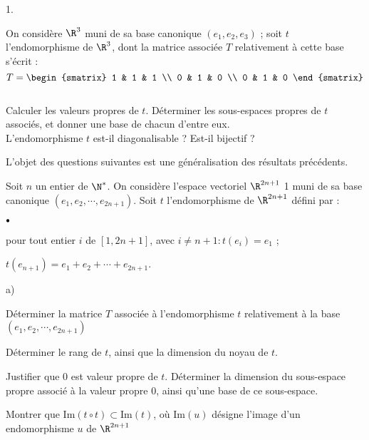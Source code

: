 \documentclass[11pt]{article}%
\begin{document}
\begin{noliste}{1.}
 \setlength{\itemsep}{4mm}
\item On considère $\R^{3}$ muni de sa base canonique $\left(
e_{1},e_{2},e_{3}\right) $ ; soit $t$ l'endomorphisme de $\R^{3}$,
dont la matrice associée $T$ relativement à cette base s'écrit : 
\[
T = 
\begin{smatrix}
1 & 1 & 1 \\
0 & 1 & 0 \\
0 & 1 & 0
\end{smatrix}
\]
\\
Calculer les valeurs propres de $t$. Déterminer les sous-espaces
propres
de $t$ associés, et donner une base de chacun d'entre eux.\\
L'endomorphisme $t$ est-il diagonalisable ? Est-il bijectif ?

\hspace{-1cm}L'objet des questions suivantes est une généralisation
des résultats précédents.

\item Soit $n$ un entier de $\N^{\ast }$. On considère l'espace
vectoriel $\R^{2n + 1}$ 1 muni de sa base canonique $\left(
e_{1},e_{2},\cdots,e_{2n + 1}\right) $. Soit $t$ l'endomorphisme de
$\R^{2n + 1}$ défini par :

\begin{noliste}{$\scriptstyle \bullet$}
\item pour tout entier $i$ de $\left[ 1,2n + 1\right] $, avec $i\neq
n + 1 :t\left( e_{i}\right) = e_{1}$ ;

\item $t\left( e_{n + 1}\right) = e_{1} + e_{2} + \cdots + e_{2n + 1}$.
\end{noliste}

\begin{noliste}{a)}
 \setlength{\itemsep}{2mm}
\item Déterminer la matrice $T$ associée à l'endomorphisme $t$
relativement à la base $\left( e_{1},e_{2},\cdots,e_{2n + 1}\right) $

\item Déterminer le rang de $t$, ainsi que la dimension du noyau de
$t$.

\item Justifier que $0$ est valeur propre de $t$. Déterminer la
dimension du sous-espace propre associé à la valeur propre $0$,
ainsi qu'une base de ce sous-espace.
\end{noliste}

\item Montrer que $\mathrm{Im}\left( t\circ t\right) \subset
\mathrm{Im}\left( t\right) $, où $\mathrm{Im}\left( u\right) $ désigne
l'image
d'un endomorphisme $u$ de $\R^{2n + 1}$


\end{noliste}
\end{document}
